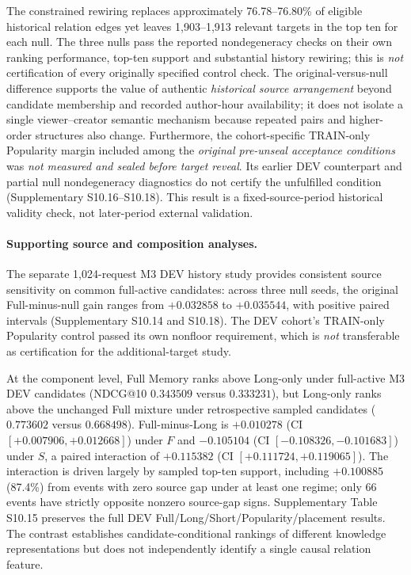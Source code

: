 The constrained rewiring replaces approximately 76.78--76.80\% of eligible historical relation edges yet leaves 1,903--1,913 relevant targets in the top ten for each null. The three nulls pass the reported nondegeneracy checks on their own ranking performance, top-ten support and substantial history rewiring; this is \emph{not} certification of every originally specified control check. The original-versus-null difference supports the value of authentic \emph{historical source arrangement} beyond candidate membership and recorded author-hour availability; it does not isolate a single viewer--creator semantic mechanism because repeated pairs and higher-order structures also change. Furthermore, the cohort-specific TRAIN-only Popularity margin included among the \emph{original pre-unseal acceptance conditions} was \emph{not measured and sealed before target reveal}. Its earlier DEV counterpart and partial null nondegeneracy diagnostics do not certify the unfulfilled condition (Supplementary S10.16--S10.18). This result is a fixed-source-period historical validity check, not later-period external validation.

\paragraph{Supporting source and composition analyses.}
The separate 1,024-request M3 DEV history study provides consistent source sensitivity on common full-active candidates: across three null seeds, the original Full-minus-null gain ranges from $+0.032858$ to $+0.035544$, with positive paired intervals (Supplementary S10.14 and S10.18). The DEV cohort's TRAIN-only Popularity control passed its own nonfloor requirement, which is \emph{not} transferable as certification for the additional-target study.

At the component level, Full Memory ranks above Long-only under full-active M3 DEV candidates (NDCG@10 $0.343509$ versus $0.333231$), but Long-only ranks above the unchanged Full mixture under retrospective sampled candidates ($0.773602$ versus $0.668498$). Full-minus-Long is $+0.010278$ (CI $[+0.007906,+0.012668]$) under $F$ and $-0.105104$ (CI $[-0.108326,-0.101683]$) under $S$, a paired interaction of $+0.115382$ (CI $[+0.111724,+0.119065]$). The interaction is driven largely by sampled top-ten support, including $+0.100885$ (87.4\%) from events with zero source gap under at least one regime; only 66 events have strictly opposite nonzero source-gap signs. Supplementary Table S10.15 preserves the full DEV Full/Long/Short/Popularity/placement results. The contrast establishes candidate-conditional rankings of different knowledge representations but does not independently identify a single causal relation feature.

